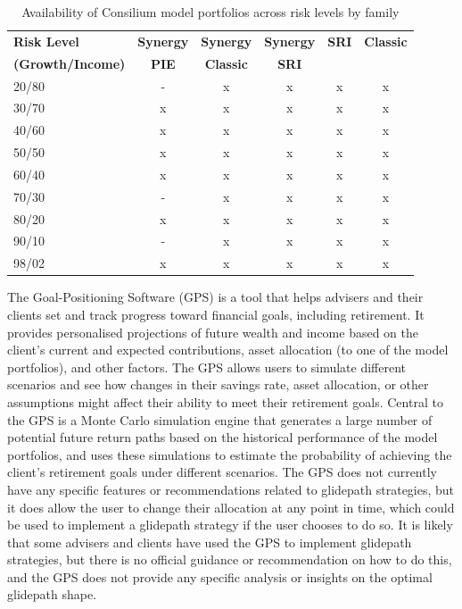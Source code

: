 \documentclass[11pt]{article}
\begin{document}
\begin{table}[h!]
  \centering
  \caption{Availability of Consilium model portfolios across risk levels by family}
  \label{tab:portfolio_availability}
  \begin{tabular}{lccccc}
  \toprule
  \textbf{Risk Level} & \textbf{Synergy} & \textbf{Synergy} & \textbf{Synergy} & \textbf{SRI} & \textbf{Classic} \\
  \textbf{(Growth/Income)} & \textbf{PIE} & \textbf{Classic} & \textbf{SRI} & \textbf{} & \textbf{} \\
  \midrule
    20/80 & - & x & x & x & x \\
    30/70 & x & x & x & x & x \\
    40/60 & x & x & x & x & x \\
    50/50 & x & x & x & x & x \\
    60/40 & x & x & x & x & x \\
    70/30 & - & x & x & x & x \\
    80/20 & x & x & x & x & x \\
    90/10 & - & x & x & x & x \\
    98/02 & x & x & x & x & x \\
      \bottomrule
  \end{tabular}
\end{table}

The Goal-Positioning Software (GPS) is a tool that helps advisers and their clients set and track progress toward financial goals, including retirement. It provides personalised projections of future wealth and income based on the client's current and expected contributions, asset allocation (to one of the model portfolios), and other factors. The GPS allows users to simulate different scenarios and see how changes in their savings rate, asset allocation, or other assumptions might affect their ability to meet their retirement goals. Central to the GPS is a Monte Carlo simulation engine that generates a large number of potential future return paths based on the historical performance of the model portfolios, and uses these simulations to estimate the probability of achieving the client's retirement goals under different scenarios. The GPS does not currently have any specific features or recommendations related to glidepath strategies, but it does allow the user to change their allocation at any point in time, which could be used to implement a glidepath strategy if the user chooses to do so. It is likely that some advisers and clients have used the GPS to implement glidepath strategies, but there is no official guidance or recommendation on how to do this, and the GPS does not provide any specific analysis or insights on the optimal glidepath shape.
\end{document}

